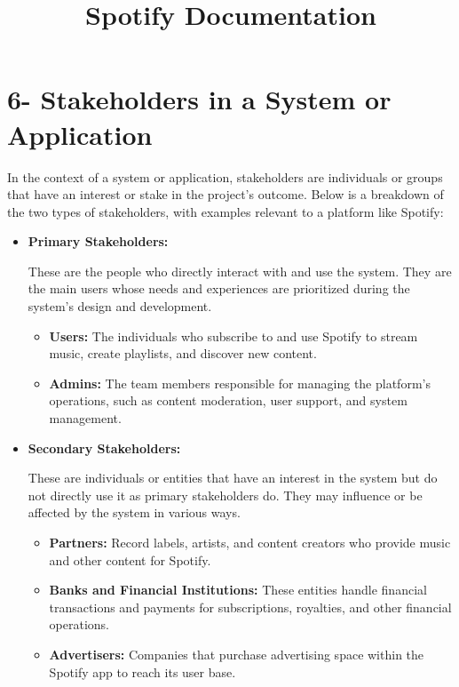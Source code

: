 \documentclass[a4paper,10pt]{article}
\title{Spotify Documentation}
\date{}
\begin{document}
\section*{6- Stakeholders in a System or Application}

In the context of a system or application, stakeholders are individuals or groups that have an interest or stake in the project's outcome. Below is a breakdown of the two types of stakeholders, with examples relevant to a platform like Spotify:

\begin{itemize}
    \item \textbf{Primary Stakeholders:}
    
    These are the people who directly interact with and use the system. They are the main users whose needs and experiences are prioritized during the system's design and development.
    
    \begin{itemize}
        \item \textbf{Users:} The individuals who subscribe to and use Spotify to stream music, create playlists, and discover new content.
        
        \item \textbf{Admins:} The team members responsible for managing the platform’s operations, such as content moderation, user support, and system management.
    \end{itemize}

    \item \textbf{Secondary Stakeholders:}
    
    These are individuals or entities that have an interest in the system but do not directly use it as primary stakeholders do. They may influence or be affected by the system in various ways.
    
    \begin{itemize}
        \item \textbf{Partners:} Record labels, artists, and content creators who provide music and other content for Spotify.
        
        \item \textbf{Banks and Financial Institutions:} These entities handle financial transactions and payments for subscriptions, royalties, and other financial operations.
        
        \item \textbf{Advertisers:} Companies that purchase advertising space within the Spotify app to reach its user base.
    \end{itemize}
    
\end{itemize}
\end{document}
